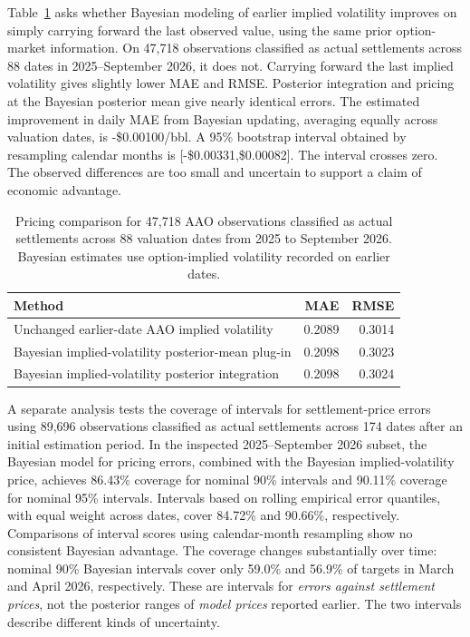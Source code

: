 Table~\ref{tab:remef_bayes_iv} asks whether Bayesian modeling
of earlier implied volatility improves on simply carrying
forward the last observed value, using the same prior
option-market information. On 47,718 observations classified as actual settlements across
88 dates in 2025--September 2026, it does not. Carrying forward the last implied volatility gives slightly
lower MAE and RMSE. Posterior integration and pricing at the
Bayesian posterior mean give nearly identical errors. The estimated improvement in daily MAE from Bayesian updating,
averaging equally across valuation dates, is -\$0.00100/bbl.
A 95\% bootstrap interval obtained by resampling calendar months
is [-\$0.00331,\$0.00082].
The interval crosses zero. The observed differences are too small and uncertain to
support a claim of economic advantage.

\begin{table}[t]
\centering
\caption{Pricing comparison for 47,718 AAO observations classified as actual settlements across 88 valuation dates from 2025 to September 2026. Bayesian estimates use option-implied volatility recorded on earlier dates.}
\label{tab:remef_bayes_iv}
\begin{tabular}{lrr}
\toprule
Method & MAE & RMSE\\
\midrule
Unchanged earlier-date AAO implied volatility & 0.2089 & 0.3014\\
Bayesian implied-volatility posterior-mean plug-in & 0.2098 & 0.3023\\
Bayesian implied-volatility posterior integration & 0.2098 & 0.3024\\
\bottomrule
\end{tabular}
\end{table}

A separate analysis tests the coverage of intervals for
settlement-price errors using 89,696 observations classified as
actual settlements across 174 dates after an initial estimation period. In the inspected 2025--September 2026
subset, the Bayesian model for pricing errors, combined with the
Bayesian implied-volatility price, achieves 86.43\% coverage for
nominal 90\% intervals and 90.11\% coverage for nominal
95\% intervals. Intervals based on rolling empirical error quantiles,
with equal weight across dates, cover 84.72\% and 90.66\%,
respectively. Comparisons of interval scores using calendar-month
resampling show no consistent Bayesian advantage. The coverage changes substantially over time:
nominal 90\% Bayesian intervals cover only 59.0\% and
56.9\% of targets in March and April 2026, respectively.
These are intervals for \emph{errors against settlement prices},
not the posterior ranges of \emph{model prices} reported earlier.
The two intervals describe different kinds of uncertainty.
